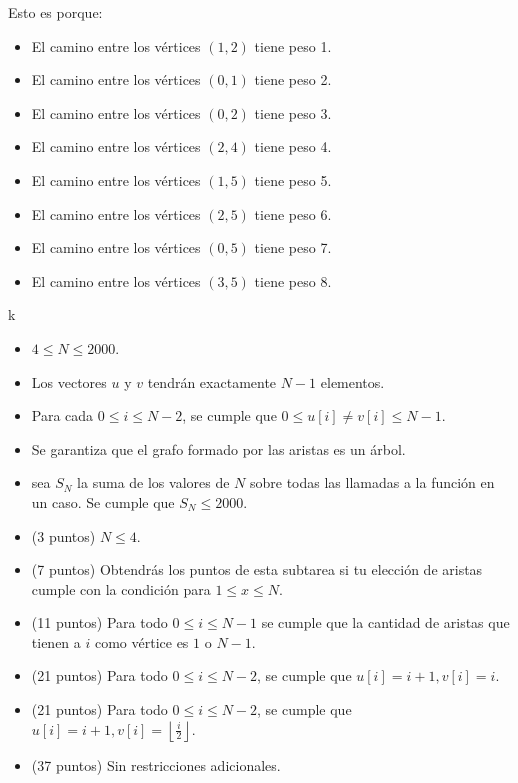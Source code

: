 \documentclass[12pt]{scrartcl}
\begin{document}
\begin{itemize}
\begin{center}
            \end{center}
            Esto es porque:
            \begin{itemize}
                \item El camino entre los vértices $(1, 2)$ tiene peso 1.
                \item El camino entre los vértices $(0, 1)$ tiene peso 2.
                \item El camino entre los vértices $(0, 2)$ tiene peso 3.
                \item El camino entre los vértices $(2, 4)$ tiene peso 4.
                \item El camino entre los vértices $(1, 5)$ tiene peso 5.
                \item El camino entre los vértices $(2, 5)$ tiene peso 6.
                \item El camino entre los vértices $(0, 5)$ tiene peso 7.
                \item El camino entre los vértices $(3, 5)$ tiene peso 8.
            \end{itemize}
        \end{itemize}
        k

        \begin{itemize}
            \item $4 \le N \le 2000$.
            \item Los vectores $u$ y $v$ tendrán exactamente $N - 1$ elementos.
            \item Para cada $0 \le i \le N - 2$, se cumple que $0 \le u[i] \neq v[i] \le N - 1$. 
            \item Se garantiza que el grafo formado por las aristas es un árbol.
            \item sea $S_N$ la suma de los valores de $N$ sobre todas las llamadas a la función en un caso. Se cumple que $S_N \le 2000$.
        \end{itemize}
    


    \begin{itemize}
        \item (3 puntos) $N \le 4$.
        \item (7 puntos) Obtendrás los puntos de esta subtarea si tu elección de aristas cumple con la condición para $1 \le x \le N$.
        \item (11 puntos) Para todo $0 \le i \le N - 1$  se cumple que la cantidad de aristas que tienen a $i$ como vértice es $1$ o $N - 1$.
        \item (21 puntos) Para todo $0 \le i \le N - 2$, se cumple que $u[i] = i + 1, v[i] = i$.
        \item (21 puntos) Para todo $0 \le i \le N - 2$, se cumple que $u[i] = i + 1, v[i] = \left\lfloor\frac{i}{2} \right\rfloor$.
        \item (37 puntos) Sin restricciones adicionales.
    \end{itemize}
\end{document}
